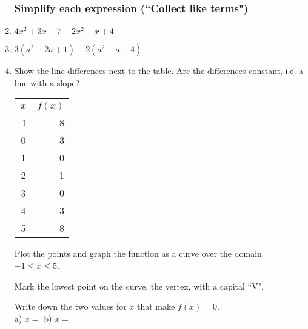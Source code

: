 \documentclass[12pt, oneside]{article}
\begin{document}
\begin{enumerate}
\subsubsection*{Simplify each expression (``Collect like terms")}

  \item $4x^2+3x -7 -2x^2-x+4$ \vspace{3cm}
  \item $3(a^2-2a +1) -2(a^2-a-4)$ \vspace{3cm}

\newpage

\item Show the line differences next to the table. Are the differences constant, i.e. a line with a slope?
    \begin{center}
      \begin{tabular}{|c|r|}
      \hline
      $x$ & $f(x)$\\
      \hline
      -1 & 8 \\
      \hline
      0 & 3 \\
      \hline
      1 & 0 \\
      \hline
      2 & -1 \\
      \hline
      3 & 0 \\
      \hline
      4 & 3 \\
      \hline
      5 & 8 \\
      \hline
      \end{tabular}
    \end{center}

Plot the points and graph the function as a curve over the domain $-1 \leq x \leq 5$.

\begin{center} %
\end{center}

Mark the lowest point on the curve, the vertex, with a capital ``V".\\ \bigskip

Write down the two values for $x$ that make $f(x)=0$. \\[0.5cm]
a) $x=$ \hspace{3cm} b) $x=$

\newpage


\end{enumerate}
\end{document}
